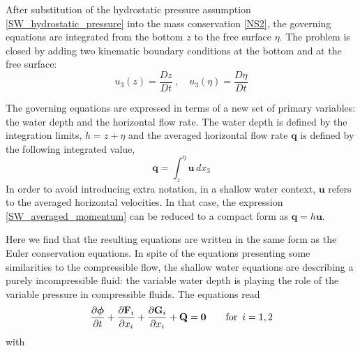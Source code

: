 After substitution of the hydrostatic pressure assumption \ref{SW_hydrostatic_pressure} into the mass conservation \ref{NS2}, the governing equations are integrated from the bottom $z$ to the free surface $\eta$. The problem is closed by adding two kinematic boundary conditions at the bottom and at the free surface:
\begin{equation}
    u_3(z) = \frac{Dz}{Dt} \ , \quad u_3(\eta) = \frac{D\eta}{Dt}
\end{equation}


The governing equations are expressed in terms of a new set of primary variables: the water depth and the horizontal flow rate. The water depth is defined by the integration limits, $h = z + \eta$ and the averaged horizontal flow rate $\mathbf{q}$ is defined by the following integrated value,
\begin{equation} \label{SW_averaged_momentum}
    \mathbf{q} = \int_z^\eta \mathbf{u}\,dx_3
\end{equation}
In order to avoid introducing extra notation, in a shallow water context, $\mathbf{u}$ refers to the averaged horizontal velocities. In that case, the expression \ref{SW_averaged_momentum} can be reduced to a compact form as $\mathbf{q} = h\mathbf{u}$.


Here we find that the resulting equations are written in the same form as the Euler conservation equations. In spite of the equations presenting some similarities to the compressible flow, the shallow water equations are describing a purely incompressible fluid: the variable water depth is playing the role of the variable pressure in compressible fluids. The equations read
\begin{equation} \label{general_sw}
\frac{\partial\bm{\phi}}{\partial t} + \frac{\partial\mathbf{F}_i}{\partial x_i} + \frac{\partial\mathbf{G}_i}{\partial x_i} + \mathbf{Q} = \mathbf{0} \qquad \text{for} \enspace i=1,2
\end{equation}
with

